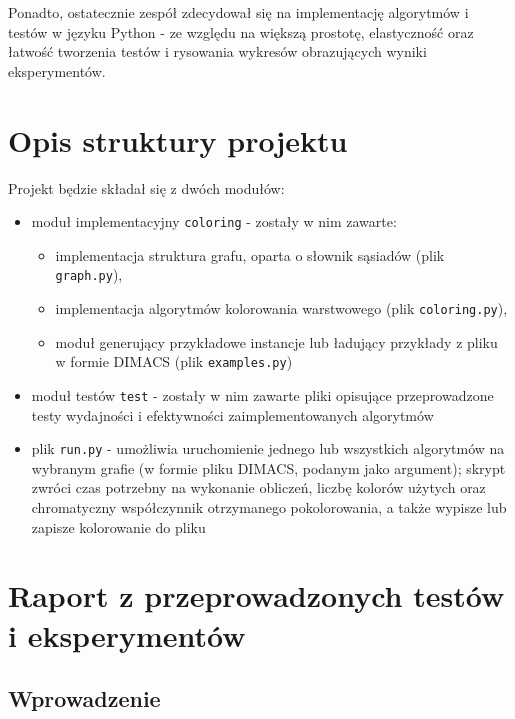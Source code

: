\documentclass[10pt,a4paper]{article}
\begin{document}
	Ponadto, ostatecznie zespół zdecydował się na implementację algorytmów i testów w języku Python - ze względu na większą prostotę, elastyczność oraz łatwość tworzenia testów i rysowania wykresów obrazujących wyniki eksperymentów.

	\section{Opis struktury projektu}
	
	Projekt będzie składał się z dwóch modułów:
	\begin{itemize}
		\item moduł implementacyjny \texttt{coloring} - zostały w nim zawarte:
			\begin{itemize}
				\item implementacja struktura grafu, oparta o słownik sąsiadów (plik \texttt{graph.py}),
				\item implementacja algorytmów kolorowania warstwowego (plik \texttt{coloring.py}),
				\item moduł generujący przykładowe instancje lub ładujący przykłady z pliku w formie DIMACS (plik \texttt{examples.py})
			\end{itemize}
		\item moduł testów \texttt{test} - zostały w nim zawarte pliki opisujące przeprowadzone testy wydajności i efektywności zaimplementowanych algorytmów
		\item plik \texttt{run.py} - umożliwia uruchomienie jednego lub wszystkich algorytmów na wybranym grafie (w formie pliku DIMACS, podanym jako argument); skrypt zwróci czas potrzebny na wykonanie obliczeń, liczbę kolorów użytych oraz chromatyczny współczynnik otrzymanego pokolorowania, a także wypisze lub zapisze kolorowanie do pliku 
	\end{itemize}

	\pagebreak
	
	\section{Raport z przeprowadzonych testów i eksperymentów}
	
	\subsection{Wprowadzenie}
	
\end{document}
